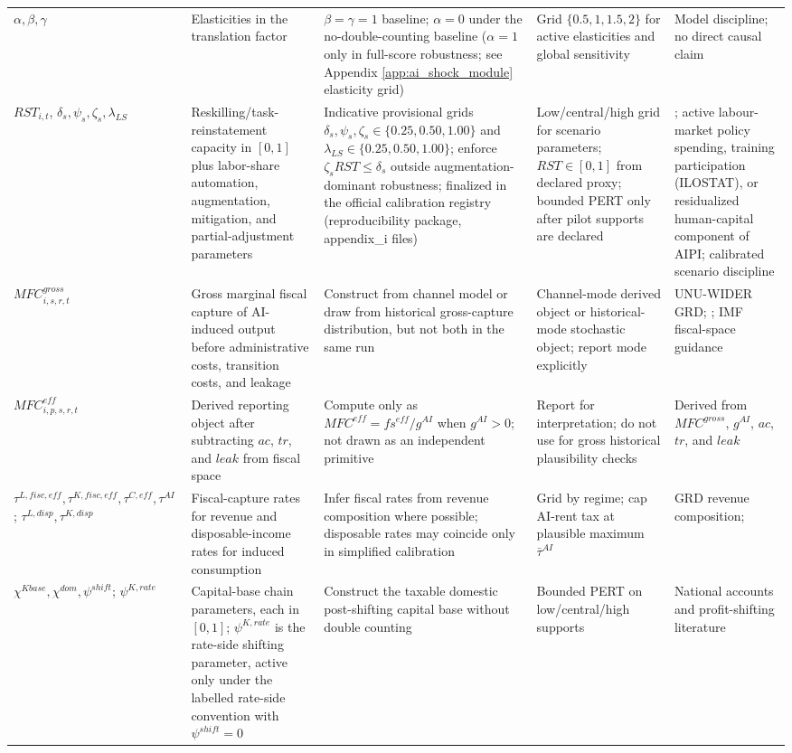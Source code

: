 \documentclass[11pt,a4paper]{article}
\begin{document}
\begin{longtable}{p{}p{}p{}p{}p{}}
$\alpha,\beta,\gamma$ & Elasticities in the translation factor & $\beta=\gamma=1$ baseline; $\alpha=0$ under the no-double-counting baseline ($\alpha=1$ only in full-score robustness; see Appendix \ref{app:ai_shock_module} elasticity grid) & Grid $\{0.5,1,1.5,2\}$ for active elasticities and global sensitivity & Model discipline; no direct causal claim \\
$RST_{i,t}$, $\delta_s,\psi_s,\zeta_s,\lambda_{LS}$ & Reskilling/task-reinstatement capacity in $[0,1]$ plus labor-share automation, augmentation, mitigation, and partial-adjustment parameters & Indicative provisional grids $\delta_s,\psi_s,\zeta_s\in\{0.25,0.50,1.00\}$ and $\lambda_{LS}\in\{0.25,0.50,1.00\}$; enforce $\zeta_sRST\leq\delta_s$ outside augmentation-dominant robustness; finalized in the official calibration registry (reproducibility package, appendix\_i files) & Low/central/high grid for scenario parameters; $RST\in[0,1]$ from declared proxy; bounded PERT only after pilot supports are declared & \citet{acemoglu2018race,acemoglu2019automation}; active labour-market policy spending, training participation (ILOSTAT), or residualized human-capital component of AIPI; calibrated scenario discipline \\
$MFC^{gross}_{i,s,r,t}$ & Gross marginal fiscal capture of AI-induced output before administrative costs, transition costs, and leakage & Construct from channel model or draw from historical gross-capture distribution, but not both in the same run & Channel-mode derived object or historical-mode stochastic object; report mode explicitly & UNU-WIDER GRD; \citet{brollo2024fiscal}; IMF fiscal-space guidance \\
$MFC^{eff}_{i,p,s,r,t}$ & Derived reporting object after subtracting $ac$, $tr$, and $leak$ from fiscal space & Compute only as $MFC^{eff}=fs^{eff}/g^{AI}$ when $g^{AI}>0$; not drawn as an independent primitive & Report for interpretation; do not use for gross historical plausibility checks & Derived from $MFC^{gross}$, $g^{AI}$, $ac$, $tr$, and $leak$ \\
$\tau^{L,fisc,eff},\tau^{K,fisc,eff},\tau^{C,eff},\tau^{AI}$; $\tau^{L,disp},\tau^{K,disp}$ & Fiscal-capture rates for revenue and disposable-income rates for induced consumption & Infer fiscal rates from revenue composition where possible; disposable rates may coincide only in simplified calibration & Grid by regime; cap AI-rent tax at plausible maximum $\bar\tau^{AI}$ & GRD revenue composition; \citet{brollo2024fiscal} \\
$\chi^{Kbase},\chi^{dom},\psi^{shift}$; $\psi^{K,rate}$ & Capital-base chain parameters, each in $[0,1]$; $\psi^{K,rate}$ is the rate-side shifting parameter, active only under the labelled rate-side convention with $\psi^{shift}=0$ & Construct the taxable domestic post-shifting capital base without double counting & Bounded PERT on low/central/high supports & National accounts and profit-shifting literature \\

\end{longtable}
\end{document}
